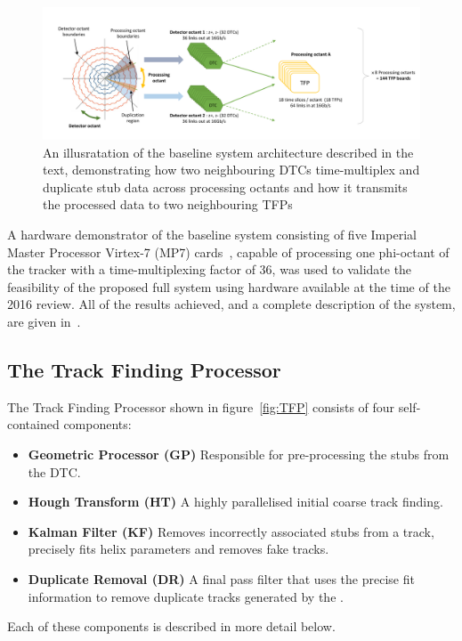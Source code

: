 \begin{figure}[t]
\centering
\includegraphics[width=1.00\textwidth]{figs/tk-upgrade/tmttarch.pdf}
\caption{An illusratation of the baseline system architecture described in the text, demonstrating how two neighbouring DTCs time-multiplex and duplicate stub data across processing octants and how it transmits the processed data to two neighbouring TFPs~\cite{TMTT_JINST}}
\label{fig:tmttarch}
\end{figure}

A hardware demonstrator of the baseline system consisting of five Imperial Master Processor Virtex-7 (MP7) cards~\cite{mp7ref}, capable of processing one phi-octant of the tracker with a time-multiplexing factor of 36, was used to validate the feasibility of the proposed full system using hardware available at the time of the 2016 review.
All of the results achieved, and a complete description of the system, are given in~\cite{TMTT_JINST}.

\subsection{The Track Finding Processor}\label{subsec:TFP}
The Track Finding Processor shown in figure~\ref{fig:TFP} consists of four self-contained components:
\begin{itemize}
\item {\bf Geometric Processor (GP)} Responsible for pre-processing the stubs from the DTC.
\item {\bf Hough Transform (HT)} A highly parallelised initial coarse track finding.
\item {\bf Kalman Filter (KF)} Removes incorrectly associated stubs from a track, precisely fits helix parameters and removes fake tracks.
\item {\bf Duplicate Removal (DR)} A final pass filter that uses the precise fit information to remove duplicate tracks generated by the \HT.
\end{itemize}

Each of these components is described in more detail below.

